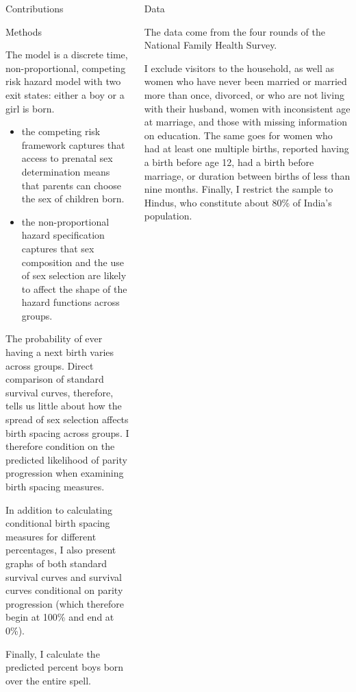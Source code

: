 \documentclass[final]{beamer}
\newlength{\onecolwid}
\newlength{\twocolwid}
\begin{document}
\begin{frame}{}
\begin{columns}[t]
\begin{column}{\onecolwid}
\begin{alertblock}{Contributions}
\end{alertblock}


\begin{block}{Methods}


The model is a discrete time, non-proportional, competing risk 
hazard model with two exit states: either a boy or a girl is born.
\begin{itemize}
\item the competing risk framework captures that access to prenatal 
sex determination means that parents can choose the sex of children born.
\item the non-proportional hazard specification captures that  
sex composition and the use of sex selection are likely to affect 
the shape of the hazard functions across groups.
\end{itemize}


The probability of ever having a next birth varies across groups.
Direct comparison of standard survival curves, therefore, tells us little 
about how the spread of sex selection affects birth spacing across groups.
I therefore condition on the predicted likelihood of parity 
progression when examining birth spacing measures.

In addition to calculating conditional birth spacing measures for different 
percentages, I also present graphs of both standard survival curves and
survival curves conditional on parity progression (which therefore
begin at 100\% and end at 0\%).

Finally, I calculate the predicted percent boys born over the entire spell.


\end{block}



\end{column}



\begin{column}{\twocolwid}

\begin{block}{Data}

The data come from the four rounds of the National Family Health Survey.

I exclude visitors to the household, as well as
women who have never been married or married more than once, divorced, or who are 
not living with their husband,
women with inconsistent age at marriage,
and those with missing information on education.
The same goes for women who had at least one multiple births,
reported having a birth before age 12, had a birth before marriage, or
duration between births of less than nine months.
Finally, I restrict the sample to Hindus,
who constitute about 80\% of India's population.


\end{block}
\end{column}
\end{columns}
\end{frame}
\end{document}
